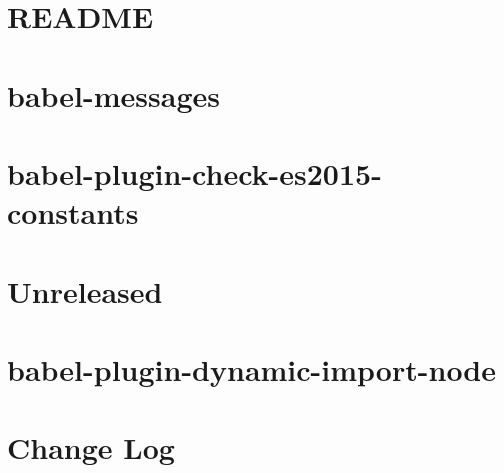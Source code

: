 \documentclass[twoside]{book}
\newcommand{\+}{\discretionary{\mbox{\scriptsize$\hookleftarrow$}}{}{}}
\begin{document}
\chapter{R\+E\+A\+D\+ME}
\label{md__c_1_workspace_demo_src_main_script_node_modules_babel-loader__r_e_a_d_m_e}

\chapter{babel-\/messages}
\label{md__c_1_workspace_demo_src_main_script_node_modules_babel-messages__r_e_a_d_m_e}

\chapter{babel-\/plugin-\/check-\/es2015-\/constants}
\label{md__c_1_workspace_demo_src_main_script_node_modules_babel-plugin-check-es2015-constants__r_e_a_d_m_e}

\chapter{Unreleased}
\label{md__c_1_workspace_demo_src_main_script_node_modules_babel-plugin-dynamic-import-node__c_h_a_n_g_e_l_o_g}

\chapter{babel-\/plugin-\/dynamic-\/import-\/node}
\label{md__c_1_workspace_demo_src_main_script_node_modules_babel-plugin-dynamic-import-node__r_e_a_d_m_e}

\chapter{Change Log}
\label{md__c_1_workspace_demo_src_main_script_node_modules_babel-plugin-istanbul__c_h_a_n_g_e_l_o_g}

\end{document}
